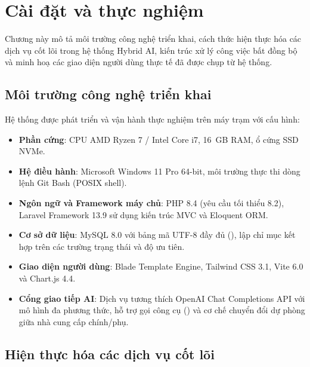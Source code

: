 \chapter{Cài đặt và thực nghiệm}
\label{ch:caidat}

\begin{muctieu}
Chương này mô tả môi trường công nghệ triển khai, cách thức hiện thực hóa
các dịch vụ cốt lõi trong hệ thống Hybrid AI, kiến trúc xử lý công việc bất
đồng bộ và minh hoạ các giao diện người dùng thực tế đã được chụp từ hệ thống.
\end{muctieu}

\section{Môi trường công nghệ triển khai}

Hệ thống được phát triển và vận hành thực nghiệm trên máy trạm với cấu hình:
\begin{itemize}[leftmargin=1.6em, itemsep=2pt]
  \item \textbf{Phần cứng}: CPU AMD Ryzen 7 / Intel Core i7, 16~GB RAM, ổ cứng SSD NVMe.
  \item \textbf{Hệ điều hành}: Microsoft Windows 11 Pro 64-bit, môi trường thực
        thi dòng lệnh Git Bash (POSIX shell).
  \item \textbf{Ngôn ngữ và Framework máy chủ}: PHP 8.4 (yêu cầu tối thiểu 8.2),
        Laravel Framework 13.9 sử dụng kiến trúc MVC và Eloquent ORM.
  \item \textbf{Cơ sở dữ liệu}: MySQL 8.0 với bảng mã UTF-8 đầy đủ (),
        lập chỉ mục kết hợp trên các trường trạng thái và độ ưu tiên.
  \item \textbf{Giao diện người dùng}: Blade Template Engine, Tailwind CSS 3.1,
        Vite 6.0 và Chart.js 4.4.
  \item \textbf{Cổng giao tiếp AI}: Dịch vụ tương thích OpenAI Chat Completions
        API với mô hình đa phương thức, hỗ trợ gọi công cụ () và cơ chế chuyển đổi dự phòng giữa nhà cung cấp chính/phụ.
\end{itemize}

\section{Hiện thực hóa các dịch vụ cốt lõi}

